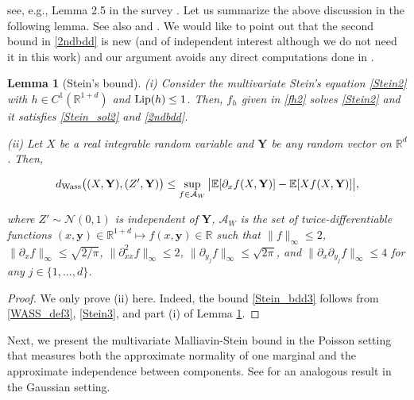 \documentclass[letterpaper, 11pt,  reqno]{amsart}
\newtheorem{lemma}[theorem]{Lemma}
\newcommand{\noi}{\noindent}
\newcommand{\R}{\mathbb{R}}
\newcommand{\bE}{\mathbb{E}}
\newcommand{\cN}{\mathcal{N}}
\newcommand{\Lip}{\textup{Lip}}
\numberwithin{equation}{section}
\numberwithin{theorem}{section}
\begin{document}
\noi
see, e.g., Lemma 2.5 in the survey \cite{Ross11}. Let us summarize 
the above discussion in the following lemma. See also \cite[Lemma 5.1]{pimentel}
and \cite[Proposition 1]{tudor23}.
We would like to point out that 
the second bound in \eqref{2ndbdd} is new (and of independent interest although 
we do not need it in this work)
and our argument avoids any direct  computations 
done in \cite{pimentel,tudor23}.







\begin{lemma}[Stein's bound] \label{lem_bdd}
{\rm (i)} Consider the multivariate Stein's equation \eqref{Stein2} with $h\in C^1(\R^{1+d})$
and $\Lip(h) \leq 1$. Then, $f_h$ given in \eqref{fh2} solves  \eqref{Stein2} and it satisfies
\eqref{Stein_sol2} and \eqref{2ndbdd}.


\smallskip

\noi
{\rm (ii)} Let $X$ be a real integrable random variable and $\mathbf{Y}$ be any
random vector on $\R^d$. Then,

\noi
\begin{align}\label{Stein_bdd3}
d_{\rm Wass}\big(  (X, \mathbf{Y}),  (Z', \mathbf{Y})     \big)
\leq \sup_{f\in\mathcal{A}_W} \big|    \bE[ \partial_x f (X,\mathbf{Y})]-\bE[X f(X,\mathbf{Y})] \big|,
\end{align}

\noi
where $Z'\sim\cN(0,1)$ is independent of $\mathbf{Y}$,
$\mathcal{A}_W$ is the set of twice-differentiable functions 
$(x, \pmb{y})\in\R^{1+d}\mapsto f(x, \pmb{y})\in\R$ such that 
 $\| f \|_\infty \leq 2$,   $\| \partial_x f \|_\infty \leq \sqrt{2/\pi}$,  
 $\|\partial^2_{xx}f \|_\infty \leq 2$, 
 $\| \partial_{y_j} f \|_\infty \leq  \sqrt{2\pi}$,
and $\| \partial_x \partial_{y_j} f  \|_\infty \leq  4$
for any $j\in\{1,..., d\}$.
\end{lemma}

\begin{proof} We only prove (ii) here. Indeed, 
the bound \eqref{Stein_bdd3} follows from 
\eqref{WASS_def3}, \eqref{Stein3},
and part (i) of  Lemma \ref{lem_bdd}. \qedhere



\end{proof}

 
Next, we present the multivariate Malliavin-Stein bound in the Poisson setting
that measures both the approximate normality of one marginal
and the approximate independence between  components.
See  \cite[Theorem 1]{tudor23} for an analogous result in the  Gaussian setting.  
\end{document}
